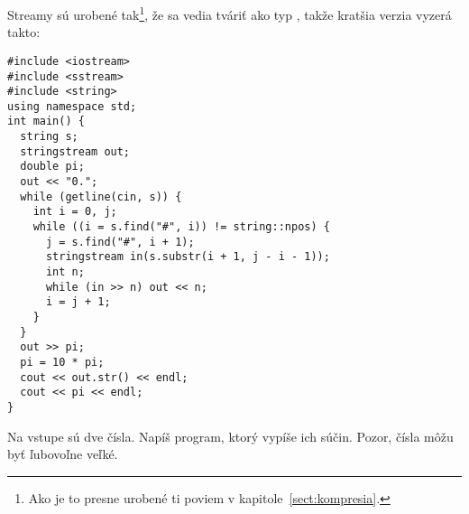 Streamy sú urobené tak\footnote{%
  Ako je to presne urobené ti poviem v kapitole~\ref{sect:kompresia}.
}, že sa vedia tváriť ako typ , takže kratšia verzia vyzerá takto:

\begin{lstlisting}
#include <iostream>
#include <sstream>
#include <string>
using namespace std;
int main() {
  string s;
  stringstream out;
  double pi;
  out << "0.";
  while (getline(cin, s)) {
    int i = 0, j;
    while ((i = s.find("#", i)) != string::npos) {
      j = s.find("#", i + 1);
      stringstream in(s.substr(i + 1, j - i - 1));
      int n;
      while (in >> n) out << n;
      i = j + 1;
    }
  }
  out >> pi;
  pi = 10 * pi;
  cout << out.str() << endl;
  cout << pi << endl;
}
\end{lstlisting}

\begin{uloha}
  Na vstupe sú dve čísla. Napíš program, ktorý vypíše ich súčin. Pozor, čísla 
  môžu byť ľubovoľne veľké.
\end{uloha}

